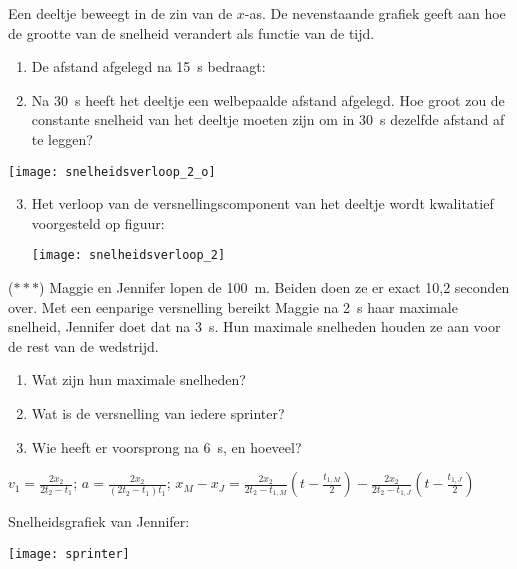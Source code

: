 \documentclass{ximera}
\begin{document}
\begin{exercise}
Een deeltje beweegt in de zin van de $x$-as. De nevenstaande grafiek geeft aan hoe de grootte van de snelheid verandert als functie van de tijd.
\begin{enumerate}
\item De afstand afgelegd na \SI{15}{s} bedraagt:

\item Na \SI{30}{s} heeft het deeltje een welbepaalde afstand afgelegd. Hoe groot zou de constante snelheid van het deeltje moeten zijn om in \SI{30}{s} dezelfde afstand af te leggen?

\end{enumerate}
\begin{image}
    \texttt{[image: snelheidsverloop\_2\_o]}
\end{image}
\begin{enumerate}
\setcounter{enumii}{2}
\item Het verloop van de versnellingscomponent van het deeltje wordt kwalitatief voorgesteld op figuur:
\begin{image}
    \texttt{[image: snelheidsverloop\_2]}
\end{image}
\end{enumerate}
\end{exercise}

\begin{exercise}
    ($\ast\ast\ast$) Maggie en Jennifer lopen de \SI{100}{m}. Beiden doen ze er exact 10,2 se\-conden over. Met een eenparige versnelling bereikt Maggie na \SI{2}{s} haar maximale snelheid, Jennifer doet dat na \SI{3}{s}. Hun maximale snelheden houden ze aan voor de rest van de wedstrijd.
    \begin{enumerate}
        \item Wat zijn hun maximale snelheden?
        \item Wat is de versnelling van iedere sprinter?
        \item Wie heeft er voorsprong na \SI{6}{s}, en hoeveel?
    \end{enumerate}
    \begin{oplossing}
        $v_1=\frac{2x_2}{2t_2-t_1}$;
        $a=\frac{2x_2}{(2t_2-t_1)t_1}$;
        $x_M-x_J=\frac{2x_2}{2t_2-t_{1,M}}(t-\frac{t_{1,M}}{2})-\frac{2x_2}{2t_2-t_{1,J}}(t-\frac{t_{1,J}}{2})$
        
        Snelheidsgrafiek van Jennifer:
        \begin{image}
            \texttt{[image: sprinter]}
        \end{image}
    \end{oplossing}
\end{exercise}
\end{document}
